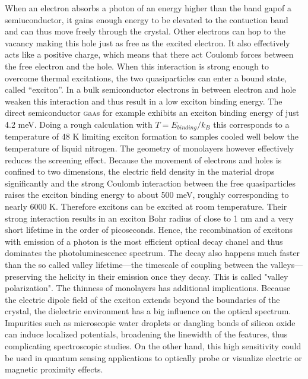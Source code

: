 When an electron absorbs a photon of an energy higher than the band gapof a semiuconductor, it gains enough energy to be elevated to the contuction band and can thus move freely through the crystal. Other electrons can hop to the vacancy making this hole just as free as the excited electron. It also effectively acts like a positive charge, which means that there act Coulomb forces between the free electron and the hole. When this interaction is strong enough to overcome thermal excitations, the two quasiparticles can enter a bound state, called ``exciton''. In a bulk semiconductor electrons in between electron and hole weaken this interaction and thus result in a low exciton binding energy. The direct semiconductor \textsc{g}{\footnotesize a}\textsc{a}{\footnotesize s} for example exhibits an exciton binding energy of just 4.2 meV. Doing a rough calculation with $T=E_{binding}/k_B$ this corresponds to a temperature of 48 K limiting exciton formation to samples cooled well below the temperature of liquid nitrogen.
The geometry of \tmdg monolayers however effectively reduces the screening effect. Because the movement of electrons and holes is confined to two dimensions, the electric field density in the material drops significantly and the strong Coulomb interaction between the free quasiparticles raises the exciton binding energy to about 500 meV\cite{chernikov_exciton_2014}, roughly corresponding to nearly 6000 K. Therefore excitons can be excited at room temperature. Their strong interaction results in an exciton Bohr radius of close to 1 nm and a very short lifetime in the order of picoseconds. Hence, the recombination of excitons with emission of a photon is the most efficient optical decay chanel and thus dominates the photoluminescence spectrum.
The decay also happens much faster than the so called valley lifetime---the timescale of coupling between the valleys---preserving the helicity in their emission once they decay. This is called "valley polarization".
The thinness of \tmdg monolayers has additional implications. Because the electric dipole field of the exciton extends beyond the boundaries of the crystal, the dielectric environment has a big influence on the optical spectrum\cite{stier_probing_2016, borghardt_engineering_2017, jakubczyk_impact_2018}. Impurities such as microscopic water droplets or dangling bonds of silicon oxide can induce localized potentials, broadening the linewidth of the \pl features, thus complicating spectroscopic studies. On the other hand, this high sensitivity could be used in quantum sensing applications to optically probe or visualize electric or magnetic proximity effects\cite{peng_valley_2017, zhao_enhanced_2017, smolenski_tuning_2016, neumann_opto-valleytronic_2017}.


